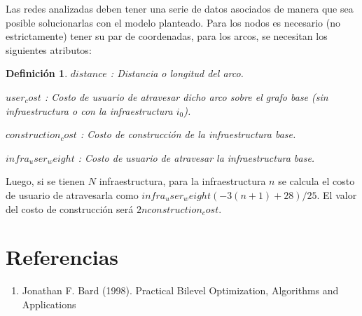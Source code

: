 \documentclass{article}
\newtheorem{definition}{Definición}
\begin{document}
  Las redes analizadas deben tener una serie de datos asociados de manera que sea posible solucionarlas con el modelo planteado. Para los nodos es necesario (no estrictamente) tener su par de coordenadas, para los arcos, se necesitan los siguientes atributos:

  \begin{definition}
    \item[$distance$]: Distancia o longitud del arco.
    \item[$user_cost$]: Costo de usuario de atravesar dicho arco sobre el grafo base (sin infraestructura o con la infraestructura $i_0$).
    \item[$construction_cost$]: Costo de construcción de la infraestructura base.
    \item[$infra_user_weight$]: Costo de usuario de atravesar la infraestructura base.
  \end{definition}

  Luego, si se tienen $N$ infraestructura, para la infraestructura $n$ se calcula el costo de usuario de atravesarla como $infra_user_weight (-3 (n + 1) + 28) / 25$. El valor del costo de construcción será $2 n construction_cost$.

  \section*{Referencias}

  \begin{enumerate}
    \item{\label{bardbook} Jonathan F. Bard (1998). Practical Bilevel Optimization, Algorithms and Applications}
  \end{enumerate}
\end{document}
